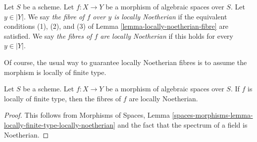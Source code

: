 \begin{definition}
\label{definition-locally-Noetherian-fibre}
Let $S$ be a scheme. Let $f : X \to Y$ be a morphism of algebraic spaces
over $S$. Let $y \in |Y|$. We say {\it the fibre of $f$ over $y$ is
locally Noetherian} if the equivalent conditions (1), (2), and (3)
of Lemma \ref{lemma-locally-noetherian-fibre} are satisfied.
We say {\it the fibres of $f$ are locally Noetherian} if this
holds for every $y \in |Y|$.
\end{definition}

\noindent
Of course, the usual way to guarantee locally Noetherian fibres is
to assume the morphism is locally of finite type.

\begin{lemma}
\label{lemma-locally-finite-type-locally-Noetherian-fibres}
Let $S$ be a scheme. Let $f : X \to Y$ be a morphism of algebraic spaces
over $S$. If $f$ is locally of finite type, then 
the fibres of $f$ are locally Noetherian.
\end{lemma}

\begin{proof}
This follows from Morphisms of Spaces, Lemma
\ref{spaces-morphisms-lemma-locally-finite-type-locally-noetherian}
and the fact that the spectrum of a field is Noetherian.
\end{proof}

